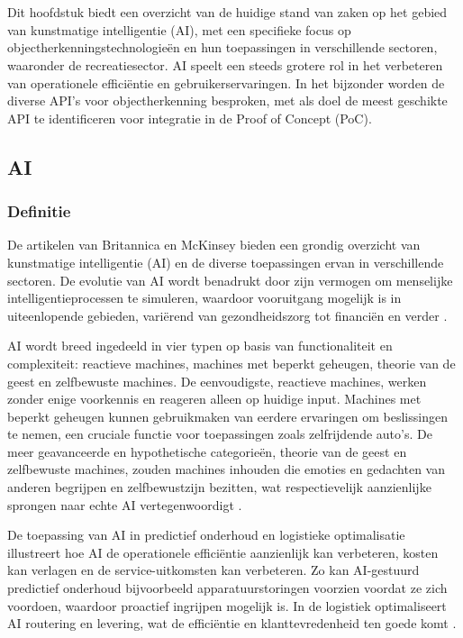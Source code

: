\chapter{}%
\label{ch:stand-van-zaken}


Dit hoofdstuk biedt een overzicht van de huidige stand van zaken op het gebied van kunstmatige intelligentie (AI), met een specifieke focus op objectherkenningstechnologieën en hun toepassingen in verschillende sectoren, waaronder de recreatiesector. AI speelt een steeds grotere rol in het verbeteren van operationele efficiëntie en gebruikerservaringen. In het bijzonder worden de diverse API's voor objectherkenning besproken, met als doel de meest geschikte API te identificeren voor integratie in de Proof of Concept (PoC).



\section{AI}
\subsection{Definitie}

De artikelen van Britannica en McKinsey bieden een grondig overzicht van kunstmatige intelligentie (AI) en de diverse toepassingen ervan in verschillende sectoren. De evolutie van AI wordt benadrukt door zijn vermogen om menselijke intelligentieprocessen te simuleren, waardoor vooruitgang mogelijk is in uiteenlopende gebieden, variërend van gezondheidszorg tot financiën en verder \autocite{mckinseyAI}.

AI wordt breed ingedeeld in vier typen op basis van functionaliteit en complexiteit: reactieve machines, machines met beperkt geheugen, theorie van de geest en zelfbewuste machines. De eenvoudigste, reactieve machines, werken zonder enige voorkennis en reageren alleen op huidige input. Machines met beperkt geheugen kunnen gebruikmaken van eerdere ervaringen om beslissingen te nemen, een cruciale functie voor toepassingen zoals zelfrijdende auto's. De meer geavanceerde en hypothetische categorieën, theorie van de geest en zelfbewuste machines, zouden machines inhouden die emoties en gedachten van anderen begrijpen en zelfbewustzijn bezitten, wat respectievelijk aanzienlijke sprongen naar echte AI vertegenwoordigt \autocite{courseraAI}.

De toepassing van AI in predictief onderhoud en logistieke optimalisatie illustreert hoe AI de operationele efficiëntie aanzienlijk kan verbeteren, kosten kan verlagen en de service-uitkomsten kan verbeteren. Zo kan AI-gestuurd predictief onderhoud bijvoorbeeld apparatuurstoringen voorzien voordat ze zich voordoen, waardoor proactief ingrijpen mogelijk is. In de logistiek optimaliseert AI routering en levering, wat de efficiëntie en klanttevredenheid ten goede komt \autocite{mckinseyAI}.

